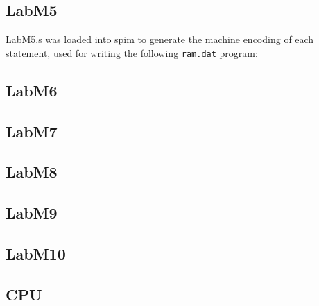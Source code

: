\documentclass{article}
\begin{document}
\subsection{LabM5}


LabM5.s was loaded into spim to generate the machine encoding of each
statement, used for writing the following \verb$ram.dat$ program:


\subsection{LabM6}


\subsection{LabM7}


\subsection{LabM8}


\subsection{LabM9}


\subsection{LabM10}


\subsection{CPU}


\end{document}
